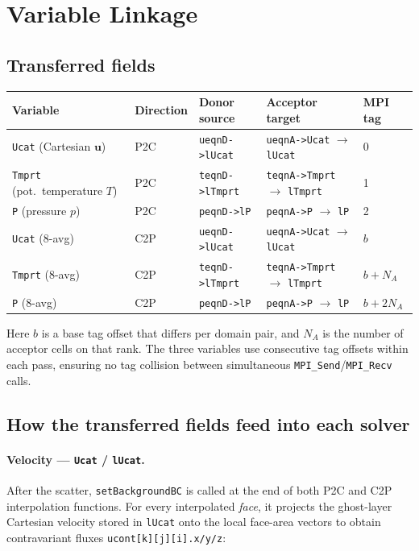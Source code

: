 \documentclass[12pt,a4paper]{article}
\begin{document}
\section{Variable Linkage}
\label{sec:overset-variables}

\subsection{Transferred fields}

\begin{center}
\begin{tabular}{lllll}
\toprule
\textbf{Variable} & \textbf{Direction} & \textbf{Donor source} & \textbf{Acceptor target} & \textbf{MPI tag} \\
\midrule
\texttt{Ucat} (Cartesian $\mathbf{u}$) & P2C & \texttt{ueqnD->lUcat}  & \texttt{ueqnA->Ucat} $\to$ \texttt{lUcat} & 0 \\
\texttt{Tmprt} (pot.\ temperature $T$) & P2C & \texttt{teqnD->lTmprt} & \texttt{teqnA->Tmprt} $\to$ \texttt{lTmprt} & 1 \\
\texttt{P} (pressure $p$)              & P2C & \texttt{peqnD->lP}     & \texttt{peqnA->P} $\to$ \texttt{lP}       & 2 \\
\midrule
\texttt{Ucat} (8-avg) & C2P & \texttt{ueqnD->lUcat}  & \texttt{ueqnA->Ucat} $\to$ \texttt{lUcat} & $b$ \\
\texttt{Tmprt} (8-avg) & C2P & \texttt{teqnD->lTmprt} & \texttt{teqnA->Tmprt} $\to$ \texttt{lTmprt} & $b{+}N_A$ \\
\texttt{P} (8-avg)    & C2P & \texttt{peqnD->lP}     & \texttt{peqnA->P} $\to$ \texttt{lP}       & $b{+}2N_A$ \\
\bottomrule
\end{tabular}
\end{center}

Here $b$ is a base tag offset that differs per domain pair, and $N_A$ is the
number of acceptor cells on that rank.
The three variables use consecutive tag offsets within each pass,
ensuring no tag collision between simultaneous \texttt{MPI\_Send}/\texttt{MPI\_Recv}
calls.

\subsection{How the transferred fields feed into each solver}

\paragraph{Velocity — \texttt{Ucat} / \texttt{lUcat}.}
After the scatter, \texttt{setBackgroundBC} is called at the end of both
P2C and C2P interpolation functions.
For every interpolated \emph{face}, it projects the ghost-layer Cartesian
velocity stored in \texttt{lUcat} onto the local face-area vectors to obtain
contravariant fluxes \texttt{ucont[k][j][i].x/y/z}:
\end{document}
